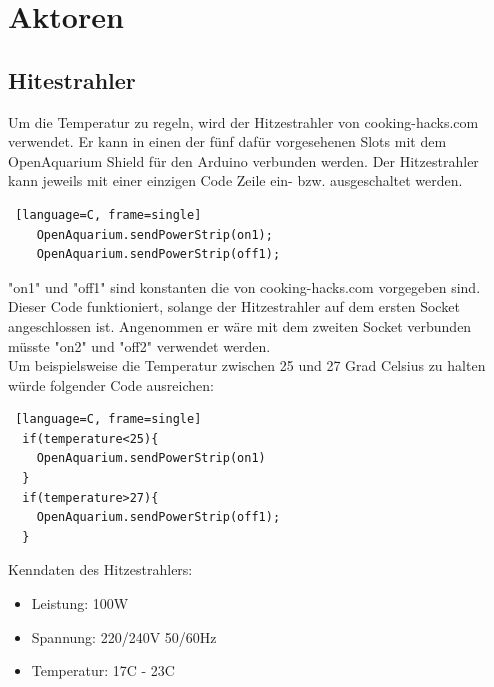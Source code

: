 \documentclass[11pt]{article}
\begin{document}
\newpage
\section{Aktoren}
\subsection{Hitestrahler}
Um die Temperatur zu regeln, wird der Hitzestrahler von cooking-hacks.com verwendet. Er kann in einen der fünf dafür vorgesehenen Slots mit dem OpenAquarium Shield für den Arduino verbunden werden. Der Hitzestrahler kann jeweils mit einer einzigen Code Zeile ein- bzw. ausgeschaltet werden.
\begin{lstlisting} [language=C, frame=single]
	OpenAquarium.sendPowerStrip(on1); 
	OpenAquarium.sendPowerStrip(off1);
\end{lstlisting}
"on1" und "off1" sind konstanten die von cooking-hacks.com vorgegeben sind.
Dieser Code funktioniert, solange der Hitzestrahler auf dem ersten Socket angeschlossen ist. Angenommen er wäre mit dem zweiten Socket verbunden müsste "on2" und "off2" verwendet werden. \\
Um beispielsweise die Temperatur zwischen 25 und 27 Grad Celsius zu halten würde folgender Code ausreichen:
\begin{lstlisting} [language=C, frame=single]
  if(temperature<25){ 
    OpenAquarium.sendPowerStrip(on1)
  }
  if(temperature>27){ 
    OpenAquarium.sendPowerStrip(off1);
  }
\end{lstlisting}
Kenndaten des Hitzestrahlers:
\begin{itemize}
\item Leistung: 100W
\item Spannung: 220/240V 50/60Hz
\item Temperatur: 17\degree C - 23\degree C
\end{itemize}
\end{document}
